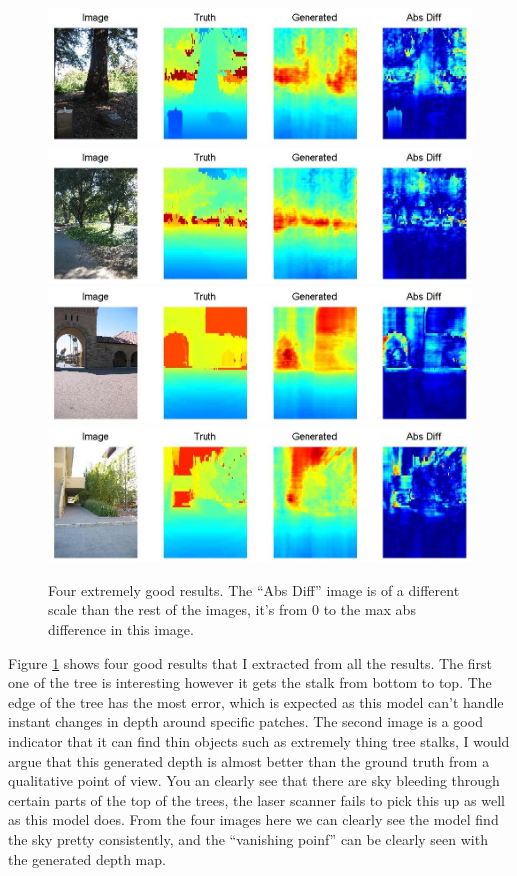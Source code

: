 \documentclass[journal]{IEEEtran}
\begin{document}
\begin{figure}
\label{fig:good}
\centering
\includegraphics[width=\linewidth]{good1.jpg} \\
\includegraphics[width=\linewidth]{good2.jpg} \\
\includegraphics[width=\linewidth]{good3.jpg} \\
\includegraphics[width=\linewidth]{good4.jpg} \\
\caption{Four extremely good results. The ``Abs Diff'' image is of a different scale than the rest of the images, it's from 0 to the max abs difference in this image.}
\end{figure}

Figure \ref{fig:good} shows four good results that I extracted from all the results. The first one of the tree is interesting however it gets the stalk from bottom to top. The edge of the tree has the most error, which is expected as this model can't handle instant changes in depth around specific patches. The second image is a good indicator that it can find thin objects such as extremely thing tree stalks, I would argue that this generated depth is almost better than the ground truth from a qualitative point of view. You an clearly see that there are sky bleeding through certain parts of the top of the trees, the laser scanner fails to pick this up as well as this model does. From the four images here we can clearly see the model find the sky pretty consistently, and the ``vanishing poinf'' can be clearly seen with the generated depth map.
\end{document}
